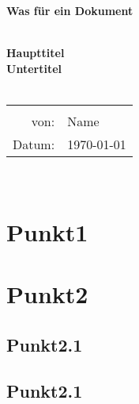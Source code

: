 \documentclass[
    ngerman,
    a4paper,
    headsepline,
    footsepline,
    12pt
    ]{scrartcl}
\newcommand{\art}{Was für ein Dokument}
\renewcommand{\author}{Name}
\newcommand{\thema}{{\Huge Haupttitel} \\[2em]
    Untertitel}
\begin{document}
    \begin{titlepage}
    \centering

        \colorbox{Green}{\hspace{30em}}
        \begin{center}
        {\LARGE \textbf{\art} }
        \end{center}
        \colorbox{Green}{\hspace{30em}}

        ~\\[8em]


        {\LARGE \textbf{\thema}} \\[1cm]
        ~\\[5em]
        \begin{tabular}{rl}
            \hline \\
            von:  & \quad \author \\[0.5em]
            Datum: & \quad \today \\[0.5em]
        \end{tabular}
        \\[10em]

        \colorbox{lightgray}{\hspace{30em}}
    \end{titlepage}

    \clearpage

    \tableofcontents

    \newpage



\section{Punkt1}

\section{Punkt2}
\subsection{Punkt2.1}
\subsection{Punkt2.1}
\end{document}
